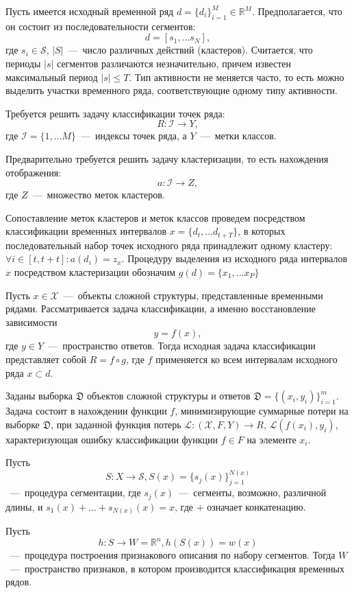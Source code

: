 \documentclass[12pt, twoside]{article}
\begin{document}
Пусть имеется исходный временной ряд $d=\{d_i\}_{i=1}^M\in \mathds{R}^M$. Предполагается, что он состоит из последовательности сегментов: $$d=[s_1,\ldots s_N],$$ где $s_i\in \mathcal{S}$, $|S|$~---~число различных действий (кластеров). Считается, что периоды $|s|$ сегментов различаются незначительно, причем известен максимальный период $|s|\leq T$. Тип активности не меняется часто, то есть можно выделить участки временного ряда, соответствующие одному типу активности.

Требуется решить задачу классификации точек ряда: $$R:\mathcal{I}\rightarrow Y,$$ где $\mathcal{I}=\{1,\ldots M\}$~---~индексы точек ряда, а $Y$~---~метки классов.

Предварительно требуется решить задачу кластеризации, то есть нахождения отображения: $$a:\mathcal{I}\rightarrow Z,$$ где $Z$~---~множество меток кластеров.

Сопоставление меток кластеров и меток классов проведем посредством классификации временных интервалов $x=\{d_t,\ldots d_{t+T}\}$, в которых последовательный набор точек исходного ряда принадлежит одному кластеру: $\forall i\in [t,t+t]:a(d_i)=z_x$. Процедуру выделения из исходного ряда интервалов $x$ посредством кластеризации обозначим $g(d)=\{x_1,\ldots x_P\}$

Пусть $x\in \mathcal{X}$~---~объекты сложной структуры, представленные временными рядами. Рассматривается задача классификации, а именно восстановление зависимости $$y=f(x),$$ где $y\in Y$~---~пространство ответов. Тогда исходная задача классификации представляет собой $R=f\circ g$, где $f$ применяется ко всем интервалам исходного ряда $x\subset d$.

Заданы выборка $\mathfrak{D}$ объектов сложной структуры и ответов $\mathfrak{D}=\{(x_i,y_i)\}_{i=1}^m$. Задача состоит в нахождении функции $f$, минимизирующие суммарные потери на выборке $\mathfrak{D}$, при заданной функция потерь $\mathscr{L}:(\mathcal{X},F,Y)\rightarrow R$, $\mathscr{L}(f(x_i),y_i)$, характеризующая ошибку классификации функции $f\in F$ на элементе $x_i$. 

Пусть $$S:X\rightarrow \mathcal{S}, S(x)=\{s_j(x)\}_{j=1}^{N(x)}$$~---~процедура сегментации, где $s_j(x)$~---~сегменты, возможно, различной длины, и $s_1(x)+\ldots+s_{N(x)}(x)=x$, где $+$ означает конкатенацию.

Пусть $$h:S\rightarrow W = \mathds{R}^n, h(S(x))=w(x)$$~---~процедура построения признакового описания по набору сегментов. Тогда $W$~---~пространство признаков, в котором производится классификация временных рядов.
\end{document}
